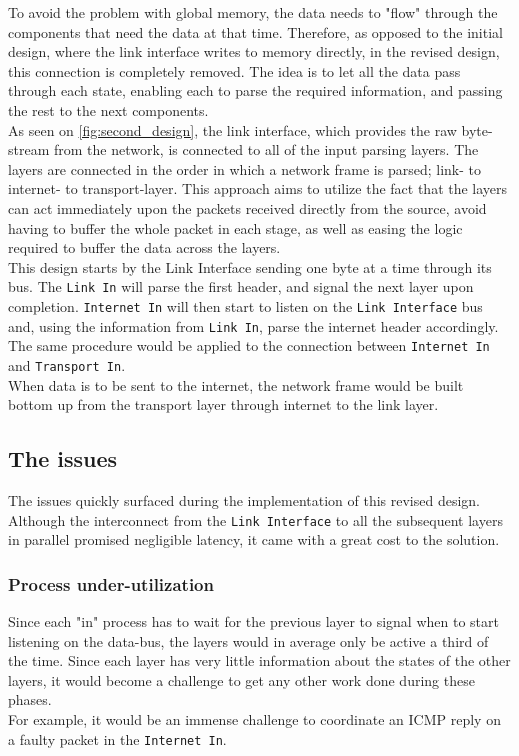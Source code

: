 To avoid the problem with global memory, the data needs to "flow" through the
components that need the data at that time. Therefore, as opposed to the initial
design, where the link interface writes to memory directly, in the revised design,
this connection is completely removed. The idea is to let all the data
pass through each state, enabling each to parse the required information, and
passing the rest to the next components.\\
As seen on \autoref{fig:second_design}, the link interface, which
provides the raw byte-stream from the network, is connected to all of the input
parsing layers. The layers are connected in the order in which a network frame
is parsed; link- to internet- to transport-layer. This approach aims to utilize
the fact that the layers can act immediately upon the packets received directly
from the source, avoid having to buffer the whole packet in each stage, as well
as easing the logic required to buffer the data across the layers.\\
This design starts by the Link Interface sending one byte at a time through its bus.
The \texttt{Link In} will parse the first header, and signal the next layer upon completion.
\texttt{Internet In} will then start to listen on the \texttt{Link Interface} bus
and, using the information from \texttt{Link In}, parse the internet header
accordingly. The same procedure would be applied to the connection between
\texttt{Internet In} and \texttt{Transport In}.\\
When data is to be sent to the internet, the network frame would be built bottom
up from the transport layer through internet to the link layer.

\subsection{The issues}
The issues quickly surfaced during the implementation of this revised design. Although
the interconnect from the \texttt{Link Interface} to all the subsequent layers
in parallel promised negligible latency, it came with a great cost to the solution.

\subsubsection{Process under-utilization} \label{item:process_utilization}
Since each "in" process has to wait for the previous layer to signal when to
start listening on the data-bus, the layers would in average only be active a third
of the time. Since each layer has very little information about the states of
the other layers, it would become a challenge to get any other work done during
these phases.\\
For example, it would be an immense challenge to coordinate an ICMP reply on a
faulty packet in the \texttt{Internet In}.

